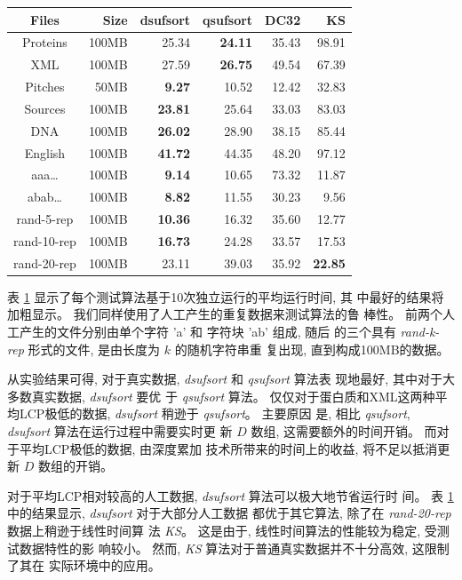 \begin{table}[!htbp]
  \centering
  \renewcommand{\arraystretch}{1.5}
  \begin{tabular}{|c|r|r|r|r|r|}
    \hline
    Files & Size   & dsufsort  & qsufsort & DC32  & KS\\
    \hline
    Proteins   & 100MB  & 25.34 &\textbf{24.11}    & 35.43 & 98.91\\
    XML        & 100MB  & 27.59 &\textbf{26.75}    & 49.54 & 67.39 \\
    Pitches    & 50MB   &\textbf{9.27 } & 10.52    & 12.42 & 32.83 \\
    Sources    & 100MB  &\textbf{23.81} & 25.64    & 33.03 & 83.03 \\
    DNA        & 100MB  &\textbf{26.02} & 28.90    & 38.15 & 85.44 \\
    English    & 100MB  &\textbf{41.72} & 44.35    & 48.20 & 97.12 \\
    \hline
    aaa\dots    & 100MB  &\textbf{9.14}  & 10.65 & 73.32 & 11.87\\
    abab\dots   & 100MB  &\textbf{8.82}  & 11.55 & 30.23 & 9.56\\
    rand-5-rep  & 100MB   &\textbf{10.36} & 16.32 & 35.60 & 12.77 \\
    rand-10-rep & 100MB   &\textbf{16.73} & 24.28 & 33.57 & 17.53 \\
    rand-20-rep & 100MB   & 23.11 & 39.03 & 35.92  & \textbf{22.85} \\
    \hline
  \end{tabular}
  \label{tab:time}
\end{table}

表 \ref{tab:time} 显示了每个测试算法基于10次独立运行的平均运行时间, 其
中最好的结果将加粗显示。 我们同样使用了人工产生的重复数据来测试算法的鲁
棒性。 前两个人工产生的文件分别由单个字符 'a' 和 字符块 'ab' 组成, 随后
的三个具有 \emph{rand-k-rep} 形式的文件, 是由长度为 $k$ 的随机字符串重
复出现, 直到构成100MB的数据。

从实验结果可得, 对于真实数据, \emph{dsufsort} 和 \emph{qsufsort} 算法表
现地最好, 其中对于大多数真实数据, \emph{dsufsort} 要优
于 \emph{qsufsort} 算法。 仅仅对于蛋白质和XML这两种平均LCP极低的数据,
\emph{dsufsort} 稍逊于 \emph{qsufsort}。 主要原因
是, 相比 \emph{qsufsort}, \emph{dsufsort} 算法在运行过程中需要实时更
新 $D$ 数组, 这需要额外的时间开销。 而对于平均LCP极低的数据, 由深度累加
技术所带来的时间上的收益, 将不足以抵消更新 $D$ 数组的开销。

对于平均LCP相对较高的人工数据, \emph{dsufsort} 算法可以极大地节省运行时
间。 表 \ref{tab:time} 中的结果显示, \emph{dsufsort} 对于大部分人工数据
都优于其它算法, 除了在 \emph{rand-20-rep} 数据上稍逊于线性时间算
法 \emph{KS}。 这是由于, 线性时间算法的性能较为稳定, 受测试数据特性的影
响较小。 然而, \emph{KS} 算法对于普通真实数据并不十分高效, 这限制了其在
实际环境中的应用。

